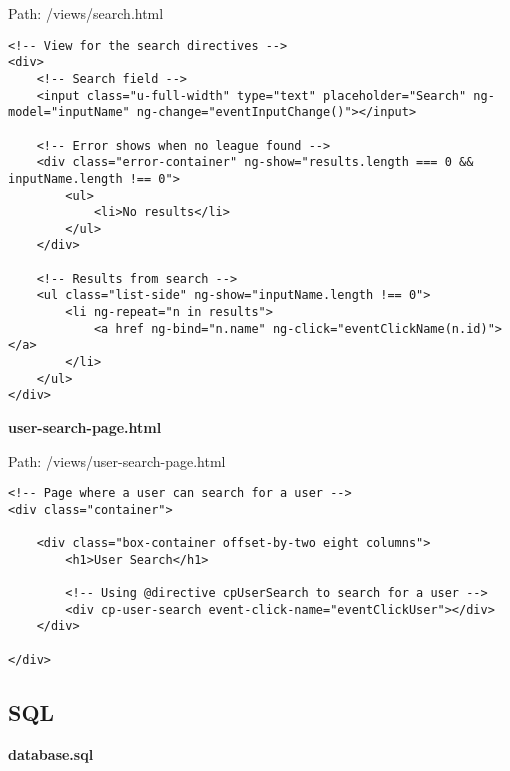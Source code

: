 Path: /views/search.html
{\scriptsize
\begin{lstlisting}
<!-- View for the search directives -->
<div>
	<!-- Search field -->
	<input class="u-full-width" type="text" placeholder="Search" ng-model="inputName" ng-change="eventInputChange()"></input>

	<!-- Error shows when no league found -->
	<div class="error-container" ng-show="results.length === 0 && inputName.length !== 0">
		<ul>
			<li>No results</li>
		</ul>
	</div>

	<!-- Results from search -->
	<ul class="list-side" ng-show="inputName.length !== 0">
		<li ng-repeat="n in results">
			<a href ng-bind="n.name" ng-click="eventClickName(n.id)"></a>
		</li>
	</ul>
</div>\end{lstlisting}
}
\textbf{user-search-page.html}

Path: /views/user-search-page.html
{\scriptsize
\begin{lstlisting}
<!-- Page where a user can search for a user -->
<div class="container">

	<div class="box-container offset-by-two eight columns">
		<h1>User Search</h1>

		<!-- Using @directive cpUserSearch to search for a user -->
		<div cp-user-search event-click-name="eventClickUser"></div>
	</div>

</div>\end{lstlisting}
}
\newpage
\subsection{SQL}
\textbf{database.sql}

